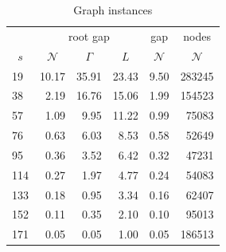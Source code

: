 \documentclass[smallextended]{svjour3hack}       %
\begin{document}
\begin{table}[!ht]
\centering
\scriptsize
\begin{tabular}{l|rrr|r|r}
\multicolumn{1}{c|}{}                & \multicolumn{3}{c|}{\scriptsize root gap}                                                   & \multicolumn{1}{c|}{\scriptsize gap} & \multicolumn{1}{c}{\raisebox{1.2pt}{{\scriptsize{$\#$}}}\! nodes} \\
\multicolumn{1}{c|}{\scriptsize $s$} & \multicolumn{1}{c}{$\mathcal{N}$} & \multicolumn{1}{c}{$\Gamma$} & \multicolumn{1}{c|}{$L$} & \multicolumn{1}{c|}{$\mathcal{N}$}   & \multicolumn{1}{c}{$\mathcal{N}$}                                 \\ \hline
19                                   & 10.17                             & 35.91                        & 23.43                    & 9.50                                 & 283245                                                            \\
38                                   & 2.19                              & 16.76                        & 15.06                    & 1.99                                 & 154523                                                            \\
57                                   & 1.09                              & 9.95                         & 11.22                    & 0.99                                 & 75083                                                             \\
76                                   & 0.63                              & 6.03                         & 8.53                     & 0.58                                 & 52649                                                             \\
95                                   & 0.36                              & 3.52                         & 6.42                     & 0.32                                 & 47231                                                             \\
114                                  & 0.27                              & 1.97                         & 4.77                     & 0.24                                 & 54083                                                             \\
133                                  & 0.18                              & 0.95                         & 3.34                     & 0.16                                 & 62407                                                             \\
152                                  & 0.11                              & 0.35                         & 2.10                     & 0.10                                 & 95013                                                             \\
171                                  & 0.05                              & 0.05                         & 1.00                     & 0.05                                 & 186513                                                           
\end{tabular}
\caption{Graph instances}\label{tab:graphs}
\end{table}
\end{document}
